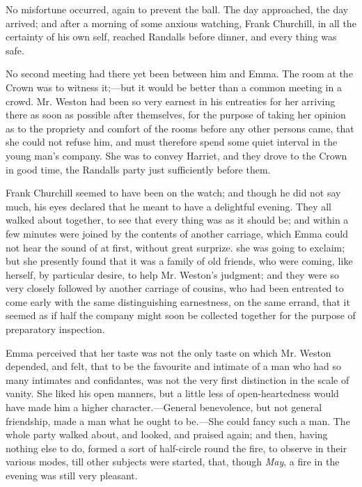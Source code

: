 No misfortune occurred, again to prevent the ball. The day approached, the day arrived; and after a morning of some anxious watching, Frank Churchill, in all the certainty of his own self, reached Randalls before dinner, and every thing was safe.

No second meeting had there yet been between him and Emma. The room at the Crown was to witness it;---but it would be better than a common meeting in a crowd. Mr. Weston had been so very earnest in his entreaties for her arriving there as soon as possible after themselves, for the purpose of taking her opinion as to the propriety and comfort of the rooms before any other persons came, that she could not refuse him, and must therefore spend some quiet interval in the young man's company. She was to convey Harriet, and they drove to the Crown in good time, the Randalls party just sufficiently before them.

Frank Churchill seemed to have been on the watch; and though he did not say much, his eyes declared that he meant to have a delightful evening. They all walked about together, to see that every thing was as it should be; and within a few minutes were joined by the contents of another carriage, which Emma could not hear the sound of at first, without great surprize.  she was going to exclaim; but she presently found that it was a family of old friends, who were coming, like herself, by particular desire, to help Mr. Weston's judgment; and they were so very closely followed by another carriage of cousins, who had been entreated to come early with the same distinguishing earnestness, on the same errand, that it seemed as if half the company might soon be collected together for the purpose of preparatory inspection.

Emma perceived that her taste was not the only taste on which Mr. Weston depended, and felt, that to be the favourite and intimate of a man who had so many intimates and confidantes, was not the very first distinction in the scale of vanity. She liked his open manners, but a little less of open-heartedness would have made him a higher character.---General benevolence, but not general friendship, made a man what he ought to be.---She could fancy such a man. The whole party walked about, and looked, and praised again; and then, having nothing else to do, formed a sort of half-circle round the fire, to observe in their various modes, till other subjects were started, that, though {\em May}, a fire in the evening was still very pleasant.

